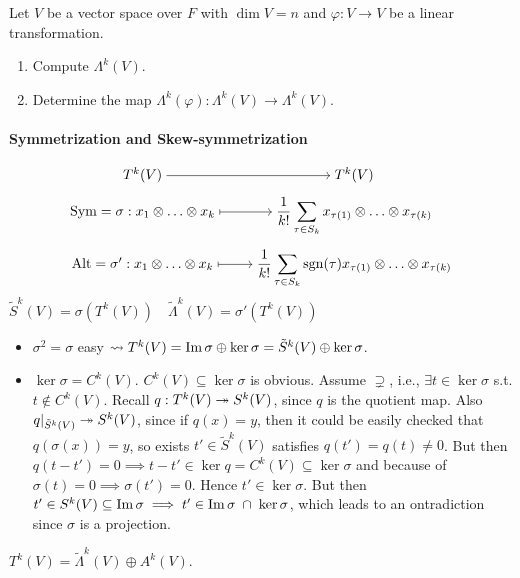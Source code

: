 \begin{exercise}
  Let $V$ be a vector space over $F$ with $\dim V = n$ and $\varphi: V\to V$
  be a linear transformation.
  \begin{enumerate}[(1)]
    \item Compute $\Lambda^k(V)$.
    \item Determine the map $\Lambda^k(\varphi): \Lambda^k(V)\to \Lambda^k(V)$.
  \end{enumerate}
\end{exercise}

\paragraph{Symmetrization and Skew-symmetrization}
\[
  \begin{tikzcd}[cramped, row sep=tiny]
    T^k(V) \arrow[r] & T^k(V) \\
    \Sym = \sigma: x_1\Ot \dots \Ot x_k \arrow[r, mapsto]
    & \displaystyle \frac{1}{k!}\sum_{\tau \in S_k}
    x_{\tau(1)}\Ot \dots \Ot x_{\tau(k)} \\
    \Alt = \sigma': x_1\Ot \dots \Ot x_k \arrow[r, mapsto]
    & \displaystyle \frac{1}{k!}\sum_{\tau \in S_k} \sgn(\tau)
    x_{\tau(1)}\Ot \dots \Ot x_{\tau(k)}
  \end{tikzcd}
\]
$\tilde{S}^k(V) = \sigma(T^k(V)) \quad \tilde{\Lambda}^k(V) = \sigma'(T^k(V))$

\begin{itemize}
  \item $\sigma^2 = \sigma$ easy $\leadsto T^k(V) = \operatorname{Im} \sigma \oplus
    \ker \sigma = \tilde{S}^k(V) \oplus \ker \sigma$.
  \item $\ker \sigma = C^k(V)$.
    $C^k(V) \subseteq \ker \sigma$ is obvious.
    Assume $\supsetneq$, i.e., $\exists t \in \ker \sigma$ s.t.
    $t \not\in C^k(V)$.
    Recall $q: T^k(V) \twoheadrightarrow S^k(V)$, since $q$ is the quotient map. Also
    $q |_{\tilde{S}^k(V)} \twoheadrightarrow S^k(V)$, since if $q(x) = y$, then it could
    be easily checked that $q(\sigma(x)) = y$, so exists $t' \in \tilde{S}^k(V)$ satisfies
    $q(t') = q(t) \neq 0$. But then $q(t-t') = 0 \implies t-t' \in \ker q = C^k(V) \subseteq
    \ker \sigma$ and because of $\sigma(t) = 0 \implies \sigma(t') = 0$. Hence $t' \in \ker \sigma$.
    But then $t' \in S^k(V) \subseteq \operatorname{Im} \sigma \implies t' \in \operatorname{Im} \sigma \;\cap\;\ker \sigma$,
    which leads to an ontradiction since $\sigma$ is a projection.
\end{itemize}

\begin{exercise}
  $T^k(V) = \tilde{\Lambda}^k(V) \oplus A^k(V)$.
\end{exercise}
